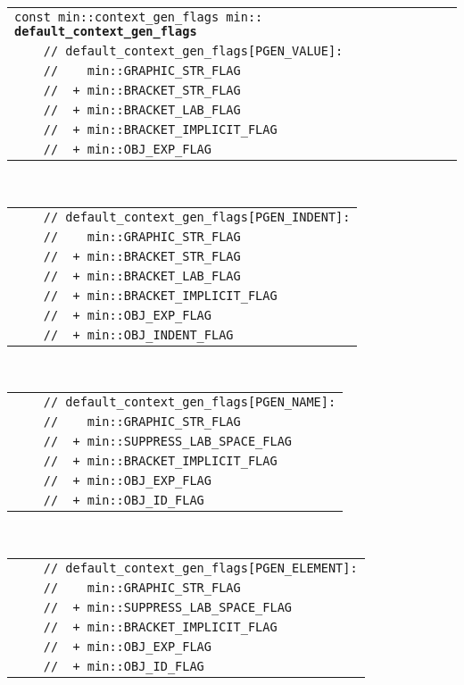 \documentclass[12pt]{article}
\makeatletter
\newcommand{\ttindex}[1]{\index{#1@{\tt #1}}}
\newcommand{\minindex}[1]{\ttindex{min::#1}\ttindex{#1}}
\newcommand{\EOL}{\penalty \exhyphenpenalty}
\newenvironment{indpar}[1][0.3in]%
	{\begin{list}{}%
		     {\setlength{\itemsep}{0in}%
		      \setlength{\topsep}{0in}%
		      \setlength{\parsep}{1ex}%
		      \setlength{\labelwidth}{#1}%
		      \setlength{\leftmargin}{#1}%
		      \addtolength{\leftmargin}{\labelsep}}%
	 \item}%
	{\end{list}}
\newcommand{\LABEL}[1]{\label{#1}}
\newcommand{\MINKEY}[1]{{\tt \bf #1}\minindex{#1}}
\makeatother
\begin{document}
\begin{indpar}[1em]
\begin{tabular}{l}
\verb|const min::context_gen_flags min::|%
    \MINKEY{default\_\EOL context\_\EOL gen\_\EOL flags}
\LABEL{MIN::DEFAULT_CONTEXT_GEN_FLAGS} \\
\verb|    // default_context_gen_flags[PGEN_VALUE]:| \\
\verb|    //    min::GRAPHIC_STR_FLAG| \\
\verb|    //  + min::BRACKET_STR_FLAG| \\
\verb|    //  + min::BRACKET_LAB_FLAG| \\
\verb|    //  + min::BRACKET_IMPLICIT_FLAG| \\
\verb|    //  + min::OBJ_EXP_FLAG| \\
\end{tabular}
\\
\begin{tabular}{l}
\verb|    // default_context_gen_flags[PGEN_INDENT]:| \\
\verb|    //    min::GRAPHIC_STR_FLAG| \\
\verb|    //  + min::BRACKET_STR_FLAG| \\
\verb|    //  + min::BRACKET_LAB_FLAG| \\
\verb|    //  + min::BRACKET_IMPLICIT_FLAG| \\
\verb|    //  + min::OBJ_EXP_FLAG| \\
\verb|    //  + min::OBJ_INDENT_FLAG| \\
\end{tabular}
\\
\begin{tabular}{l}
\verb|    // default_context_gen_flags[PGEN_NAME]:| \\
\verb|    //    min::GRAPHIC_STR_FLAG| \\
\verb|    //  + min::SUPPRESS_LAB_SPACE_FLAG| \\
\verb|    //  + min::BRACKET_IMPLICIT_FLAG| \\
\verb|    //  + min::OBJ_EXP_FLAG| \\
\verb|    //  + min::OBJ_ID_FLAG| \\
\end{tabular}
\\
\begin{tabular}{l}
\verb|    // default_context_gen_flags[PGEN_ELEMENT]:| \\
\verb|    //    min::GRAPHIC_STR_FLAG| \\
\verb|    //  + min::SUPPRESS_LAB_SPACE_FLAG| \\
\verb|    //  + min::BRACKET_IMPLICIT_FLAG| \\
\verb|    //  + min::OBJ_EXP_FLAG| \\
\verb|    //  + min::OBJ_ID_FLAG| \\
\end{tabular}
\end{indpar}
\end{document}
